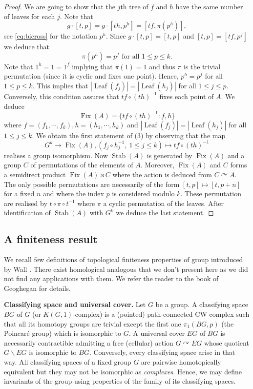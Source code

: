 \documentclass[a4paper, 12pt]{amsart}
\numberwithin{equation}{section}
\theoremstyle{definition}
\newcommand{\act}{\curvearrowright}
\newcommand{\bs}{\backslash}
\DeclareMathOperator{\Fix}{Fix}
\DeclareMathOperator{\Leaf}{Leaf}
\DeclareMathOperator{\Stab}{Stab}
\begin{document}
\begin{proof}
We are going to show that the $j$th tree of $f$ and $h$ have the same number of leaves for each $j$.
Note that 
$$g\cdot [t,p] = g\cdot [th,p^h] = [tf, \pi(p^h)],$$
see \eqref{eq:bicross} for the notation $p^h$.
Since $g\cdot [t,p]=[t,p]$ and $[t,p]=[tf,p^f]$ we deduce that
$$\pi(p^h)=p^f \text{ for all } 1\leq p\leq k.$$
Note that $1^h=1=1^f$ implying that $\pi(1)=1$ and thus $\pi$ is the trivial permutation (since it is cyclic and fixes one point).
Hence, $p^h=p^f$ for all $1\leq p\leq k$.
This implies that $|\Leaf(f_j)|=|\Leaf(h_j)|$ for all $1\leq j\leq p$.
Conversely, this condition assures that $tf\circ (th)^{-1}$ fixes each point of $A$.
We deduce
$$\Fix(A)=\{ tf\circ (th)^{-1}:f,h\}$$
where $f=(f_1,\cdots,f_k), h=(h_1,\cdots,h_k)$ and $|\Leaf(f_j)|=|\Leaf(h_j)|$ for all $1\leq j\leq k.$ 
We obtain the first statement of (3) by observing that the map
$$G^k\to \Fix(A), (f_j\circ h_j^{-1},\ 1\leq j\leq k)\mapsto tf\circ (th)^{-1}$$
realises a group isomorphism.
Now $\Stab(A)$ is generated by $\Fix(A)$ and a group $C$ of permutations of the elements of $A$. 
Moreover, $\Fix(A)$ and $C$ forms a semidirect product $\Fix(A)\rtimes C$ where the action is deduced from $C\act A$.
The only possible permutations are necessarily of the form $[t,p]\mapsto [t,p+n]$ for a fixed $n$ and where the index $p$ is considered modulo $k$.
These permutation are realised by $t\circ \pi\circ t^{-1}$ where $\pi$ a cyclic permutation of the leaves.
After identification of $\Stab(A)$ with $G^k$ we deduce the last statement.
\end{proof}

\subsection{A finiteness result}\label{sec:def-finiteness}
We recall few definitions of topological finiteness properties of group introduced by Wall \cite{Wall65}. There exist homological analogous that we don't present here as we did not find any applications with them. We refer the reader to the book of Geoghegan \cite[Sections 7 and 8]{Geoghegan-book} for details.

{\bf Classifying space and universal cover.}
Let $G$ be a group. 
A classifying space $BG$ of $G$ (or $K(G,1)$-complex) is a (pointed) path-connected CW complex such that all its homotopy groups are trivial except the first one $\pi_1(BG,p)$ (the Poincar\'e group) which is isomorphic to $G$.
A universal cover $EG$ of $BG$ is necessarily contractible admitting a free (cellular) action $G\act EG$ whose quotient $G\bs EG$ is isomorphic to $BG$.
Conversely, every classifying space arise in that way.
All classifying spaces of a fixed group $G$ are pairwise homotopically equivalent but they may not be isomorphic as {\it complexes}.
Hence, we may define invariants of the group using properties of the family of its classifying spaces.
\end{document}
